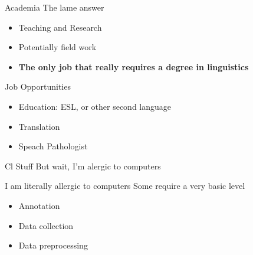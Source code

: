 \documentclass[aspectratio=169,hyperref={unicode}]{beamer}
\begin{document}
\begin{frame}{Academia}
The lame answer
  \begin{itemize}
    \item Teaching and Research
	\item Potentially field work 
    \item \textbf{The only job that really requires a degree in linguistics}

  \end{itemize}
\end{frame}

\begin{frame}{Job Opportunities}
  \begin{itemize}
    \item Education: ESL, or other second language
    \item Translation
    \item Speach Pathologist
  \end{itemize}
\end{frame}


\begin{frame}{Cl Stuff}
But wait, I'm alergic to computers
\end{frame}

\begin{frame}{I am literally allergic to computers}
Some require a very basic level
  \begin{itemize}
    \item Annotation
    \item Data collection
    \item Data preprocessing
  \end{itemize}


\end{frame}
\end{document}
